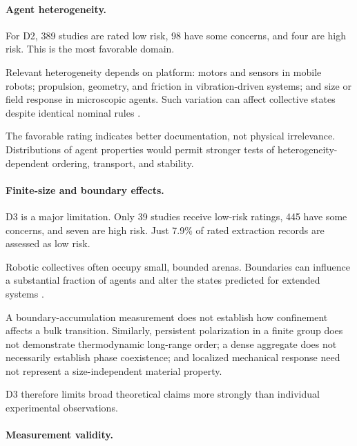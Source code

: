 \paragraph*{Agent heterogeneity.}

For D2, 389 studies are rated low risk,
98 have some concerns, and four are high risk.
This is the most favorable domain.

Relevant heterogeneity depends on platform:
motors and sensors in mobile robots;
propulsion, geometry, and friction in
vibration-driven systems; and size or
field response in microscopic agents.
Such variation can affect collective
states despite identical nominal rules
\cite{Welch2018aggregatesuppressio,Deblais2019howtoforceanarmy,Xie2020bioinspiredsoftmic,Pauer2021programmabledesign,Li2019particleroboticsba,Vsrhelyi2018optimizedflockingo,Zion2023morphologicalcomput}.

The favorable rating indicates better
documentation, not physical irrelevance.
Distributions of agent properties would
permit stronger tests of heterogeneity-dependent
ordering, transport, and stability.

\paragraph*{Finite-size and boundary effects.}

D3 is a major limitation. Only 39 studies
receive low-risk ratings, 445 have some
concerns, and seven are high risk.
Just 7.9\% of rated extraction records
are assessed as low risk.

Robotic collectives often occupy small,
bounded arenas. Boundaries can influence
a substantial fraction of agents and alter
the states predicted for extended systems
\cite{Deblais2018boundariescontrolc,Boudet2025effectsofboundarie,Casiulis2025ageometricconditio,Wang2025hyperuniformnetwork,Zhang2026emergentnonhermiti,Coulais2025activemetamaterials,Wagner2026geometryinducedtra}.

A boundary-accumulation measurement does
not establish how confinement affects
a bulk transition. Similarly, persistent
polarization in a finite group does not
demonstrate thermodynamic long-range order;
a dense aggregate does not necessarily
establish phase coexistence; and localized
mechanical response need not represent
a size-independent material property.

D3 therefore limits broad theoretical
claims more strongly than individual
experimental observations.

\paragraph*{Measurement validity.}

